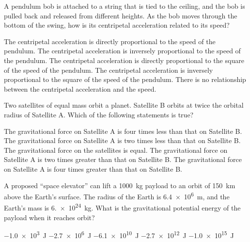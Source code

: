\documentclass{../../../oss-ap12ibhl}
\begin{document}
\begin{questions}
  \question A pendulum bob is attached to a string that is tied to the ceiling,
  and the bob is pulled back and released from different heights. As the bob
  moves through the bottom of the swing, how is its centripetal acceleration
  related to its speed?
  \begin{choices}
    \choice The centripetal acceleration is directly proportional to the speed
    of the pendulum.
    \choice The centripetal acceleration is inversely proportional to the speed
    of the pendulum.
    \choice The centripetal acceleration is directly proportional to the square
    of the speed of the pendulum.
    \choice The centripetal acceleration is inversely proportional to the square
    of the speed of the pendulum.
    \choice There is no relationship between the centripetal acceleration and
    the speed.
  \end{choices}
  \vspace{.7in}
  
  \question Two satellites of equal mass orbit a planet. Satellite B orbits at
  twice the orbital radius of Satellite A. Which of the following statements is
  true?
  \begin{choices}
    \choice The gravitational force on Satellite A is four times less than that
    on Satellite B.
    \choice The gravitational force on Satellite A is two times less than that
    on Satellite B.
    \choice The gravitational force on the satellites is equal.
    \choice The gravitational force on Satellite A is two times greater than
    that on Satellite B.
    \choice The gravitational force on Satellite A is four times greater than
    that on Satellite B.
  \end{choices}
  \vspace{.7in}
    
  \question A proposed ``space elevator'' can lift a \SI{1000}{\kilo\gram}
  payload to an orbit of \SI{150}{\kilo\metre} above the Earth's surface. The
  radius of the Earth is \SI{6.4e6}{\metre}, and the Earth's mass is
  \SI{6.e24}{\kilo\gram}. What is the gravitational potential energy of the
  payload when it reaches orbit?
  \begin{choices}
    \choice\SI{-1.0e3}{\joule}
    \choice\SI{-2.7e6}{\joule}
    \choice\SI{-6.1e10}{\joule}
    \choice\SI{-2.7e12}{\joule}
    \choice\SI{-1.0e15}{\joule}
  \end{choices}
  \newpage

  

\end{questions}
\end{document}
